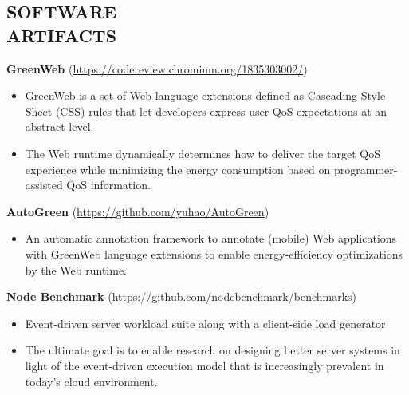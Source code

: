 \documentclass[margin, 9pt]{res} %
\begin{document}
\begin{resume}

\section{SOFTWARE\\ ARTIFACTS}

\textbf{GreenWeb} (\url{https://codereview.chromium.org/1835303002/})
\begin{itemize}[leftmargin=*] \itemsep -3pt
\vspace*{-4pt}
  \item GreenWeb is a set of Web language extensions defined as Cascading Style Sheet (CSS) rules that let developers express user QoS expectations at an abstract level.
  \item The Web runtime dynamically determines how to deliver the target QoS experience while minimizing the energy consumption based on programmer-assisted QoS information. \par
\end{itemize}

\medskip
\textbf{AutoGreen} (\url{https://github.com/yuhao/AutoGreen})
\begin{itemize}[leftmargin=*] \itemsep -3pt
\vspace*{-4pt}
  \item An automatic annotation framework to annotate (mobile) Web applications with GreenWeb language extensions to enable energy-efficiency optimizations by the Web runtime. \par
\end{itemize}

\medskip
\textbf{Node Benchmark} (\url{https://github.com/nodebenchmark/benchmarks})
\begin{itemize}[leftmargin=*] \itemsep -3pt
\vspace*{-4pt}
	\item Event-driven server workload suite along with a client-side load generator \par
        \item The ultimate goal is to enable research on designing better server systems in light of the event-driven execution model that is increasingly prevalent in today's cloud environment. \par
\end{itemize}


\end{resume}
\end{document}
